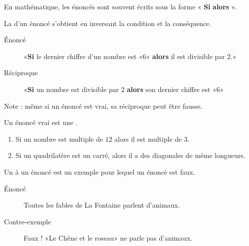 
En mathématique, les énoncés sont souvent écrits sous la forme « {\bf Si}  {\bf alors} ».

\begin{definition}
    La  d'un énoncé s'obtient en inversant la condition et la conséquence.
\end{definition}

\begin{example}
    \begin{description}
        \item[Énoncé] «{\bf Si} le dernier chiffre d'un nombre est «\( 6\)» {\bf alors} il est divisible par \( 2\).» 
        \item[Réciproque] «{\bf Si} un nombre est divisible par \( 2\) {\bf alors} son dernier chiffre est «\( 6\)» 
    \end{description}
    Note : même si un énoncé est vrai, sa réciproque peut être fausse.
\end{example}

\begin{Aretenir}
    Un énoncé vrai est une .
\end{Aretenir}

\begin{example}
    \begin{enumerate}
        \item
            Si un nombre est multiple de \( 12\) alors il est multiple de \( 3\).
        \item
            Si un quadrilatère est un carré, alors il a des diagonales de même longueurs.
    \end{enumerate}
\end{example}

\begin{definition}
    Un  à un énoncé est un exemple pour lequel un énoncé est faux.
\end{definition}

\begin{example}
    \begin{description}
        \item[Énoncé] Toutes les fables de La Fontaine parlent d'animaux.
        \item[Contre-exemple] Faux ! «Le Chêne et le roseau» ne parle pas d'animaux.
    \end{description}
\end{example}


